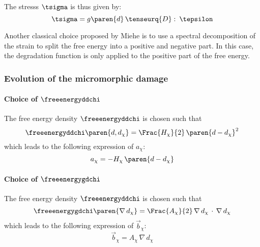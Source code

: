 The stresss $\tsigma$ is thus given by:
\begin{equation}
  \tsigma = g\paren{d}\,\tenseurq{D}\,\colon\,\tepsilon
\end{equation}

Another classical choice proposed by Miehe \cite{miehe_phase_2010} is to
use a spectral decomposition of the strain to split the free energy into
a positive and negative part. In this case, the degradation function is only applied
to the positive part of the free energy.

\subsubsection{Evolution of the micromorphic damage}

\paragraph{Choice of $\freeenergyddchi$}

The free energy density $\freeenergyddchi$ is chosen such that
%
%
%
\begin{equation}
  \freeenergyddchi\paren{d, d_{\chi}}=\Frac{H_{\chi}}{2}\,\paren{d-d_{\chi}}^{2}
\end{equation}
%
%
%
which leads to the following expression of $a_{\chi}$:
\begin{equation}
  \label{eq:micromorphicdamage:achi}
  a_{\chi} = - H_{\chi}\,\paren{d-d_{\chi}}
\end{equation}

\paragraph{Choice of $\freeenergygdchi$}

The free energy density $\freeenergyddchi$ is chosen such that
%
%
%
\begin{equation}
  \label{eq:micromorphicdamage:freeenergygdchi}
  \freeenergygdchi\paren{\nabla\, d_{\chi}} = \Frac{A_{\chi}}{2}\,\nabla\, d_{\chi}\,\cdot\,\nabla\, d_{\chi}
\end{equation}
%
%
%
which leads to the following expression of $\vec{b}_{\chi}$:
%
%
%
\begin{equation}
  \label{eq:micromorphicdamage:bchi}
  \vec{b}_{\chi} = A_{\chi}\,\nabla\, d_{\chi}
\end{equation}

